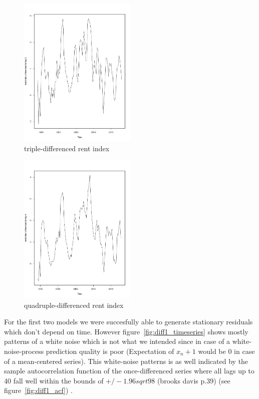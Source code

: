 \documentclass[11pt,a4paper]{article}
\begin{document}
\begin{figure}
\centering
\includegraphics[angle=0,
width=0.5\textwidth]{diff3_timeseries}
\caption{triple-differenced rent index
\label{fig:diff3_timeseries}}
\end{figure}
\begin{figure}
\centering
\includegraphics[angle=0,
width=0.5\textwidth]{diff4_timeseries}
\caption{quadruple-differenced rent index
\label{fig:diff4_timeseries}}
\end{figure}
For the first two models we were succesfully able to generate stationary residuals which don't depend on time. However figure~\ref{fig:diff1_timeseries} shows mostly patterns of a white noise which is not what we intended since in case of a white-noise-process prediction quality is poor (Expectation of $x_n+1$ would be 0 in case of a mean-centered series). This white-noise patterns is as well indicated by the sample autocorrelation function of the once-differenced series where all lags up to 40 fall well within the bounds of $+/-1.96sqrt{98}$ (brooks davis p.39)  (see figure~\ref{fig:diff1_acf}) . 
\end{document}
